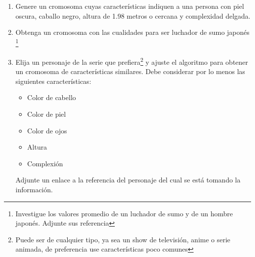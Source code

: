 \documentclass[10pt,letterpaper]{article}
\begin{document}
\begin{enumerate}
    \item Genere un cromosoma cuyas características indiquen a una persona con
    piel oscura, caballo negro, altura de 1.98 metros o cercana y complexidad
    delgada.
    \item Obtenga un cromosoma con las cualidades para ser luchador de sumo japonés
    \footnote{Investigue los valores promedio de un luchador de sumo y de un hombre
    japonés. Adjunte sus referencia}
    \item Elija un personaje de la serie que prefiera\footnote{Puede ser de cualquier
    tipo, ya sea un show de televisión, anime o serie animada, de preferencia use
    características poco comunes} y ajuste el algoritmo para obtener
    un cromosoma de características similares. Debe considerar por lo menos las
    siguientes características:
        \begin{itemize}
            \item Color de cabello
            \item Color de piel
            \item Color de ojos
            \item Altura
            \item Complexión
        \end{itemize}
    Adjunte un enlace a la referencia del personaje del cual se está tomando la información.


\end{enumerate}
\end{document}
